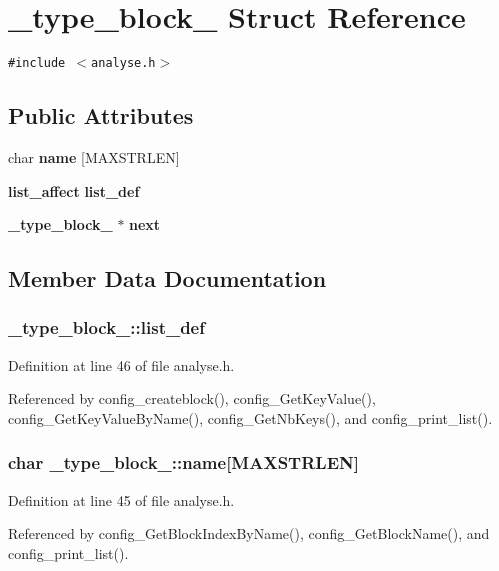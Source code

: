 \section{\_\-type\_\-block\_\- Struct Reference}
\label{struct__type__block__}
{\tt \#include $<$analyse.h$>$}

\subsection*{Public Attributes}
\begin{CompactItemize}
\item 
char {\bf name} [MAXSTRLEN]
\item 
{\bf list\_\-affect} {\bf list\_\-def}
\item 
{\bf \_\-type\_\-block\_\-} $\ast$ {\bf next}
\end{CompactItemize}


\subsection{Member Data Documentation}
\subsubsection{ {\bf \_\-type\_\-block\_\-::list\_\-def}}\label{struct__type__block___o1}




Definition at line 46 of file analyse.h.

Referenced by config\_\-createblock(), config\_\-Get\-Key\-Value(), config\_\-Get\-Key\-Value\-By\-Name(), config\_\-Get\-Nb\-Keys(), and config\_\-print\_\-list().
\subsubsection{\setlength{\rightskip}{0pt plus 5cm}char {\bf \_\-type\_\-block\_\-::name}[MAXSTRLEN]}\label{struct__type__block___o0}




Definition at line 45 of file analyse.h.

Referenced by config\_\-Get\-Block\-Index\-By\-Name(), config\_\-Get\-Block\-Name(), and config\_\-print\_\-list().
